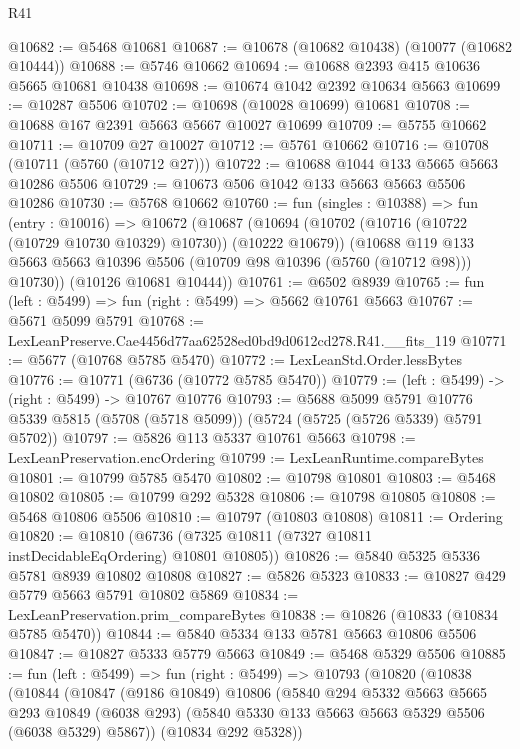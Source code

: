 \begin{lexlean}{R41}
\begin{coremodule}
@10682 := @5468 @10681
@10687 := @10678 (@10682 @10438) (@10077 (@10682 @10444))
@10688 := @5746 @10662
@10694 := @10688 @2393 @415 @10636 @5665 @10681 @10438
@10698 := @10674 @1042 @2392 @10634 @5663
@10699 := @10287 @5506
@10702 := @10698 (@10028 @10699) @10681
@10708 := @10688 @167 @2391 @5663 @5667 @10027 @10699
@10709 := @5755 @10662
@10711 := @10709 @27 @10027
@10712 := @5761 @10662
@10716 := @10708 (@10711 (@5760 (@10712 @27)))
@10722 := @10688 @1044 @133 @5665 @5663 @10286 @5506
@10729 := @10673 @506 @1042 @133 @5663 @5663 @5506 @10286
@10730 := @5768 @10662
@10760 := fun (singles : @10388) =>
  fun (entry : @10016) =>
  @10672
    (@10687
      (@10694
        (@10702 (@10716 (@10722 (@10729 @10730 @10329) @10730)) (@10222 @10679))
        (@10688 @119 @133 @5663 @5663 @10396 @5506 (@10709 @98 @10396 (@5760 (@10712 @98))) @10730))
      (@10126 @10681 @10444))
@10761 := @6502 @8939
@10765 := fun (left : @5499) => fun (right : @5499) => @5662 @10761 @5663
@10767 := @5671 @5099 @5791
@10768 := LexLeanPreserve.Cae4456d77aa62528ed0bd9d0612cd278.R41.__fits_119
@10771 := @5677 (@10768 @5785 @5470)
@10772 := LexLeanStd.Order.lessBytes
@10776 := @10771 (@6736 (@10772 @5785 @5470))
@10779 := (left : @5499) -> (right : @5499) -> @10767 @10776
@10793 := @5688
    @5099
    @5791
    @10776
    @5339
    @5815
    (@5708 (@5718 @5099))
    (@5724 (@5725 (@5726 @5339) @5791 @5702))
@10797 := @5826 @113 @5337 @10761 @5663
@10798 := LexLeanPreservation.encOrdering
@10799 := LexLeanRuntime.compareBytes
@10801 := @10799 @5785 @5470
@10802 := @10798 @10801
@10803 := @5468 @10802
@10805 := @10799 @292 @5328
@10806 := @10798 @10805
@10808 := @5468 @10806 @5506
@10810 := @10797 (@10803 @10808)
@10811 := Ordering
@10820 := @10810 (@6736 (@7325 @10811 (@7327 @10811 instDecidableEqOrdering) @10801 @10805))
@10826 := @5840 @5325 @5336 @5781 @8939 @10802 @10808
@10827 := @5826 @5323
@10833 := @10827 @429 @5779 @5663 @5791 @10802 @5869
@10834 := LexLeanPreservation.prim_compareBytes
@10838 := @10826 (@10833 (@10834 @5785 @5470))
@10844 := @5840 @5334 @133 @5781 @5663 @10806 @5506
@10847 := @10827 @5333 @5779 @5663
@10849 := @5468 @5329 @5506
@10885 := fun (left : @5499) =>
  fun (right : @5499) =>
  @10793
    (@10820
      (@10838
        (@10844
          (@10847
            (@9186 @10849)
            @10806
            (@5840
              @294
              @5332
              @5663
              @5665
              @293
              @10849
              (@6038 @293)
              (@5840 @5330 @133 @5663 @5663 @5329 @5506 (@6038 @5329) @5867))
            (@10834 @292 @5328))

\end{coremodule}
\end{lexlean}
